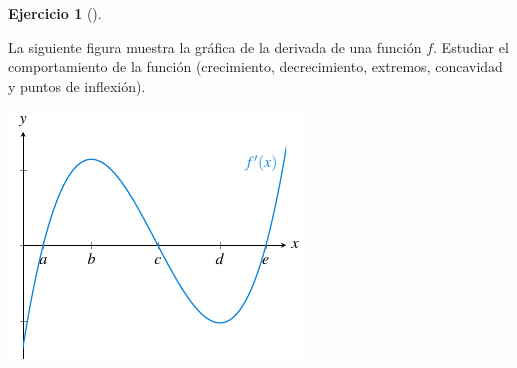 \documentclass[
  a4paper,
]{scrreport}
\theoremstyle{definition}
\newtheorem{exercise}{Ejercicio}[chapter]
\theoremstyle{remark}
\begin{document}
\leavevmode{}%
\begin{exercise}[]\label{exr-extremos-1}

La siguiente figura muestra la gráfica de la derivada de una función
\(f\). Estudiar el comportamiento de la función (crecimiento,
decrecimiento, extremos, concavidad y puntos de inflexión).

\includegraphics{././img/derivadas/grafica-ext-1.png}

\end{exercise}
\end{document}
